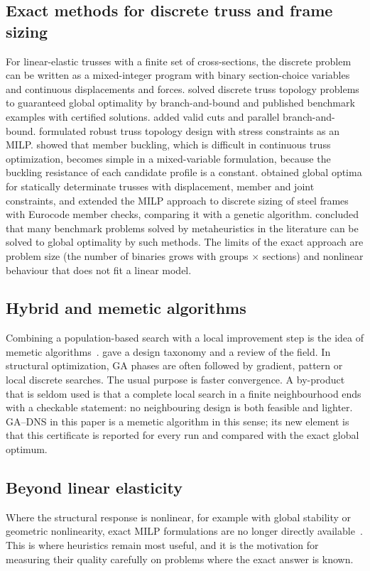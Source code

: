 \documentclass[lineno,pdflatex,sn-mathphys-num]{sn-jnl}
\begin{document}
\subsection{Exact methods for discrete truss and frame sizing}
For linear-elastic trusses with a finite set of cross-sections, the discrete
problem can be written as a mixed-integer program with binary section-choice
variables and continuous displacements and forces.
\citet{Achtziger2007} solved discrete truss topology problems to guaranteed
global optimality by branch-and-bound and published benchmark examples with
certified solutions. \citet{Rasmussen2008} added valid cuts and parallel
branch-and-bound. \citet{Kanno2010} formulated robust truss topology design with
stress constraints as an MILP. \citet{Mela2014} showed that member buckling,
which is difficult in continuous truss optimization, becomes simple in a
mixed-variable formulation, because the buckling resistance of each candidate
profile is a constant. \citet{VanMellaert2016} obtained global optima for
statically determinate trusses with displacement, member and joint constraints,
and \citet{VanMellaert2018} extended the MILP approach to discrete sizing of
steel frames with Eurocode member checks, comparing it with a genetic
algorithm. \citet{Stolpe2016} concluded that many benchmark problems solved by
metaheuristics in the literature can be solved to global optimality by such
methods. The limits of the exact approach are problem size (the number of
binaries grows with groups $\times$ sections) and nonlinear behaviour that does
not fit a linear model.

\subsection{Hybrid and memetic algorithms}
Combining a population-based search with a local improvement step is the
idea of memetic algorithms~\citep{Moscato1989}. \citet{Krasnogor2005} gave a
design taxonomy and \citet{Neri2012} a review of the field. In structural
optimization, GA phases are often followed by gradient, pattern or local
discrete searches. The usual purpose is faster convergence. A by-product that
is seldom used is that a complete local search in a finite neighbourhood ends
with a checkable statement: no neighbouring design is both feasible and
lighter. GA--DNS in this paper is a memetic algorithm in this sense; its new
element is that this certificate is reported for every run and compared with
the exact global optimum.

\subsection{Beyond linear elasticity}
Where the structural response is nonlinear, for example with global stability
or geometric nonlinearity, exact MILP formulations are no longer directly
available~\citep{Descamps2014,Mela2014}. This is where heuristics remain most
useful, and it is the motivation for measuring their quality carefully on
problems where the exact answer is known.
\end{document}
